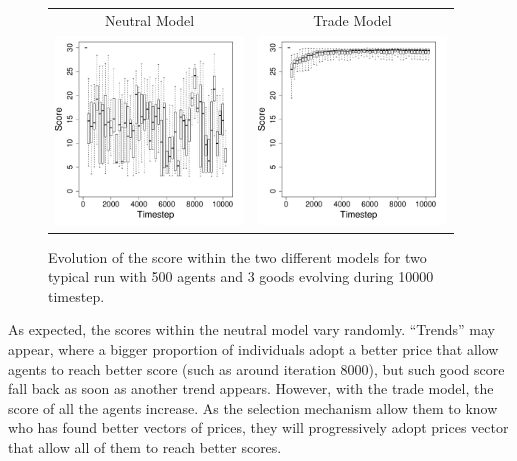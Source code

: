 \documentclass{wscpaperproc}
\begin{document}
\begin{figure}[h]
	\centering
	\begin{tabular}{ c c}
		 Neutral Model & Trade Model \\
		 \includegraphics[width=5cm]{img/ScoreEvolutionForRandom-G3N500.pdf}
		 & \includegraphics[width=5cm]{img/ScoreEvolutionForTrade-G3N500.pdf}

	\end{tabular}
	\caption{Evolution of the score within the two different models for two typical run with 500 agents and 3 goods evolving during 10000 timestep.}%
	\label{fig:scoreEvol}
\end{figure}


As expected, the scores within the neutral model vary randomly. ``Trends'' may appear, where a bigger proportion of individuals adopt a better price that allow agents to reach better score (such as around iteration 8000), but such good score fall back as soon as another trend appears. However, with the trade model, the score of all the agents increase. As the selection mechanism allow them to know who has found better vectors of prices, they will progressively adopt prices vector that allow all of them to reach better scores. 
\end{document}
